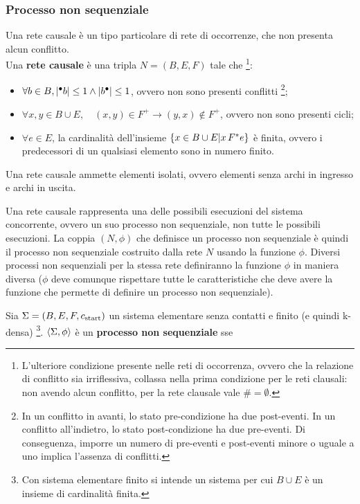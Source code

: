 \subsubsection{Processo non sequenziale}
Una rete causale è un tipo particolare di rete di occorrenze, che non presenta alcun conflitto.\\
Una \textbf{rete causale} è una tripla $N = (B, E, F)$ tale che \footnote[][-1cm]{L'ulteriore condizione presente nelle reti di occorrenza, ovvero che la relazione di conflitto sia irriflessiva, collassa nella prima condizione per le reti clausali: non avendo alcun conflitto, per la rete clausale vale $\# = \emptyset$.}:
\begin{itemize}
    \item $\forall b \in B, \lvert {^\bullet}b \rvert \le 1 \land \lvert b^\bullet \rvert \le 1$, ovvero non sono presenti conflitti \footnote[][1cm]{In un conflitto in avanti, lo stato pre-condizione ha due post-eventi. In un conflitto all'indietro, lo stato post-condizione ha due pre-eventi. Di conseguenza, imporre un numero di pre-eventi e post-eventi minore o uguale a uno implica l'assenza di conflitti.};
    \item $\forall x, y \in B \cup E, \quad (x, y) \in F^+ \rightarrow (y, x) \notin F^+$, ovvero non sono presenti cicli;
    \item $\forall e \in E$, la cardinalità dell'insieme $\left\{x \in B \cup E | x \, F^* e\right\}$ è finita, ovvero i predecessori di un qualsiasi elemento sono in numero finito.
\end{itemize}

\begin{rem}
    Una rete causale ammette elementi isolati, ovvero elementi senza archi in ingresso e archi in uscita.
\end{rem}

Una rete causale rappresenta una delle possibili esecuzioni del sistema concorrente, ovvero un suo processo non sequenziale, non tutte le possibili esecuzioni. La coppia $(N, \phi)$ che definisce un processo non sequenziale è quindi il processo non sequenziale costruito dalla rete $N$ usando la funzione $\phi$. Diversi processi non sequenziali per la stessa rete definiranno la funzione $\phi$ in maniera diversa ($\phi$ deve comunque rispettare tutte le caratteristiche che deve avere la funzione che permette di definire un processo non sequenziale).

Sia $\Sigma = (B, E, F, c_{\textnormal{start}})$ un sistema elementare senza contatti e finito (e quindi k-densa) \footnote{Con sistema elementare finito si intende un sistema per cui $B \cup E$ è un insieme di cardinalità finita.}.
$\left\langle\Sigma, \phi\right\rangle$ è un \textbf{processo non sequenziale} sse 

